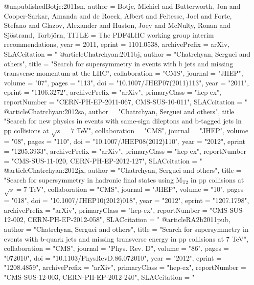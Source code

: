 @unpublished{Botje:2011sn,
  author         = {Botje, Michiel and Butterworth, Jon and Cooper-Sarkar, Amanda
                    and de Roeck, Albert and Feltesse, Joel and Forte, Stefano
                    and Glazov,  Alexander and Huston, Joey and McNulty, Ronan and
                    Sj{\"o}strand, Torbj{\"o}rn},
  TITLE          = {The {PDF4LHC} working group interim recommendations},
  year           = {2011},
  eprint         = {1101.0538},
  archivePrefix  = {arXiv},
  SLACcitation   = "%
}
@article{Chatrchyan:2011bj,
      author         = "Chatrchyan, Serguei and others",
      title          = "{Search for supersymmetry in events with b jets and
                        missing transverse momentum at the {LHC}}",
      collaboration  = "CMS",
      journal        = "JHEP",
      volume         = "07",
      pages          = "113",
      doi            = "10.1007/JHEP07(2011)113",
      year           = "2011",
      eprint         = "1106.3272",
      archivePrefix  = "arXiv",
      primaryClass   = "hep-ex",
      reportNumber   = "CERN-PH-EP-2011-067, CMS-SUS-10-011",
      SLACcitation   = "%
}
@article{Chatrchyan:2012sa,
      author         = "Chatrchyan, Serguei and others",
      title          = "{Search for new physics in events with same-sign
                        dileptons and b-tagged jets in pp collisions at
                        $\sqrt{s}=7$ TeV}",
      collaboration  = "CMS",
      journal        = "JHEP",
      volume         = "08",
      pages          = "110",
      doi            = "10.1007/JHEP08(2012)110",
      year           = "2012",
      eprint         = "1205.3933",
      archivePrefix  = "arXiv",
      primaryClass   = "hep-ex",
      reportNumber   = "CMS-SUS-11-020, CERN-PH-EP-2012-127",
      SLACcitation   = "%
}
@article{Chatrchyan:2012jx,
      author         = "Chatrchyan, Serguei and others",
      title          = "{Search for supersymmetry in hadronic final states using
                        M$_{\mathrm T2}$ in pp collisions at $\sqrt{s} = 7$ TeV}",
      collaboration  = "CMS",
      journal        = "JHEP",
      volume         = "10",
      pages          = "018",
      doi            = "10.1007/JHEP10(2012)018",
      year           = "2012",
      eprint         = "1207.1798",
      archivePrefix  = "arXiv",
      primaryClass   = "hep-ex",
      reportNumber   = "CMS-SUS-12-002, CERN-PH-EP-2012-058",
      SLACcitation   = "%
}
@article{RA2b2011pub,
      author         = "Chatrchyan, Serguei and others",
      title          = "{Search for supersymmetry in events with b-quark jets and
                        missing transverse energy in pp collisions at 7 TeV}",
      collaboration  = "CMS",
      journal        = "Phys. Rev. D",
      volume         = "86",
      pages          = "072010",
      doi            = "10.1103/PhysRevD.86.072010",
      year           = "2012",
      eprint         = "1208.4859",
      archivePrefix  = "arXiv",
      primaryClass   = "hep-ex",
      reportNumber   = "CMS-SUS-12-003, CERN-PH-EP-2012-240",
      SLACcitation   = "%
}
